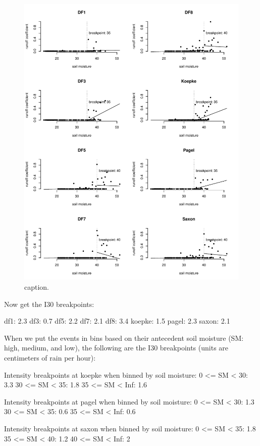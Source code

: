 \documentclass[12pt]{article}
\begin{document}
\begin{figure}
    \begin{center}
\includegraphics{runoff-sm}
    \end{center}
    \caption{caption.\label{sm}}
\end{figure}


Now get the I30 breakpoints:\\

\begin{Schunk}
\begin{Soutput}
df1: 2.3
df3: 0.7
df5: 2.2
df7: 2.1
df8: 3.4
koepke: 1.5
pagel: 2.3
saxon: 2.1
\end{Soutput}
\end{Schunk}


When we put the events in bins based on their antecedent soil moisture (SM: high, medium, and low), the following are the I30 breakpoints (units are centimeters of rain per hour):\\

\begin{Schunk}
\begin{Soutput}
Intensity breakpoints at koepke when binned by soil moisture:
0 <= SM < 30: 3.3
30 <= SM < 35: 1.8
35 <= SM < Inf: 1.6

Intensity breakpoints at pagel when binned by soil moisture:
0 <= SM < 30: 1.3
30 <= SM < 35: 0.6
35 <= SM < Inf: 0.6

Intensity breakpoints at saxon when binned by soil moisture:
0 <= SM < 35: 1.8
35 <= SM < 40: 1.2
40 <= SM < Inf: 2
\end{Soutput}
\end{Schunk}
\end{document}
